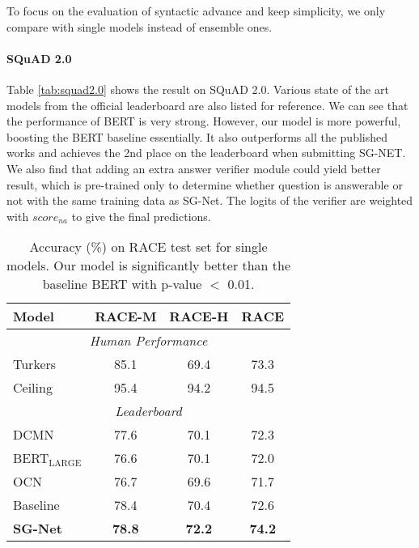 \documentclass[letterpaper]{article} \usepackage{color}
\begin{document}
To focus on the evaluation of syntactic advance and keep simplicity, we only compare with single models instead of ensemble ones.

\paragraph{SQuAD 2.0}



Table \ref{tab:squad2.0} shows the result on SQuAD 2.0. Various state of the art models from the official leaderboard are also listed for reference. We can see that the performance of BERT is very strong. However, our model is more powerful, boosting the BERT baseline essentially. It also outperforms all the published works and achieves the 2nd place on the leaderboard when submitting SG-NET. We also find that adding an extra answer verifier module could yield better result, which is pre-trained only to determine whether question is answerable or not with the same training data as SG-Net. The logits of the verifier are weighted with $score_{na}$ to give the final predictions.

\begin{table}
	\centering
	{
		\begin{tabular}{l c c c}
			\hline
			\hline
			\textbf{Model} &   \textbf{RACE-M}  & \textbf{RACE-H} & \textbf{RACE}	\\
			\hline
			\multicolumn{4}{c}{\emph{Human Performance}} \\
			Turkers  & 85.1 & 69.4 & 73.3\\
			Ceiling  & 95.4 & 94.2& 94.5 \\
			\hline
			\multicolumn{4}{c}{\emph{Leaderboard}} \\
			DCMN  & 77.6 & 70.1  & 72.3\\
			BERT$_\text{LARGE}$ 	& 	76.6 & 70.1 & 72.0  \\
			OCN  & 76.7 & 69.6 & 71.7  \\ 
			\hline
			Baseline & 78.4 & 70.4& 72.6 \\
			\textbf{SG-Net} & \textbf{78.8} & \textbf{72.2} & \textbf{74.2}\\
			\hline
			\hline
		\end{tabular}
	}
	\caption{\label{tab:race} Accuracy (\%) on RACE test set for single models. Our model is significantly better than the baseline BERT with p-value $<$ 0.01.}
\end{table}
\end{document}
